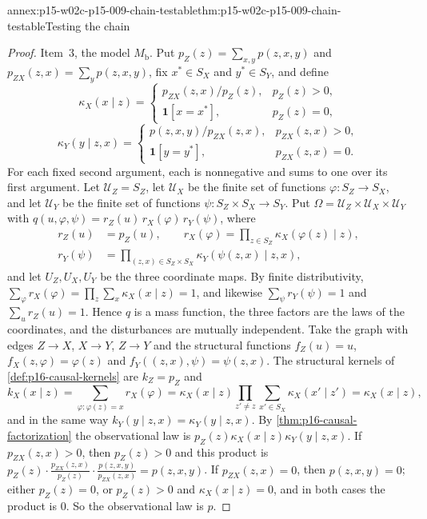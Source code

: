 \begin{annexitem}{annex:p15-w02c-p15-009-chain-testable}{thm:p15-w02c-p15-009-chain-testable}{Testing the chain}
\begin{proof}
Item~3, the model \(M_{\mathrm b}\). Put
\(p_Z(z)=\sum_{x,y}p(z,x,y)\) and \(p_{ZX}(z,x)=\sum_yp(z,x,y)\), fix
\(x^*\in S_X\) and \(y^*\in S_Y\), and define
\[
 \kappa_X(x\mid z)=
 \begin{cases}p_{ZX}(z,x)/p_Z(z),&p_Z(z)>0,\\
  \mathbf 1[x=x^*],&p_Z(z)=0,\end{cases}
\]
\[
 \kappa_Y(y\mid z,x)=
 \begin{cases}p(z,x,y)/p_{ZX}(z,x),&p_{ZX}(z,x)>0,\\
  \mathbf 1[y=y^*],&p_{ZX}(z,x)=0.\end{cases}
\]
For each fixed second argument, each is nonnegative and sums to one over
its first argument. Let \(\mathcal U_Z=S_Z\), let \(\mathcal U_X\) be the
finite set of functions \(\varphi:S_Z\to S_X\), and let \(\mathcal U_Y\)
be the finite set of functions \(\psi:S_Z\times S_X\to S_Y\). Put
\(\Omega=\mathcal U_Z\times\mathcal U_X\times\mathcal U_Y\) with
\(q(u,\varphi,\psi)=r_Z(u)\,r_X(\varphi)\,r_Y(\psi)\), where
\[
\begin{aligned}
 r_Z(u)&=p_Z(u),\qquad
 r_X(\varphi)=\prod_{z\in S_Z}\kappa_X(\varphi(z)\mid z),\\
 r_Y(\psi)&=\prod_{(z,x)\in S_Z\times S_X}\kappa_Y(\psi(z,x)\mid z,x),
\end{aligned}
\]
and let \(U_Z,U_X,U_Y\) be the three coordinate maps. By finite
distributivity, \(\sum_\varphi r_X(\varphi)
=\prod_z\sum_x\kappa_X(x\mid z)=1\), and likewise
\(\sum_\psi r_Y(\psi)=1\) and \(\sum_ur_Z(u)=1\). Hence \(q\) is a mass
function, the three factors are the laws of the coordinates, and the
disturbances are mutually independent. Take the graph with edges
\(Z\to X\), \(X\to Y\), \(Z\to Y\) and the structural functions
\(f_Z(u)=u\), \(f_X(z,\varphi)=\varphi(z)\) and
\(f_Y((z,x),\psi)=\psi(z,x)\). The structural kernels of
\cref{def:p16-causal-kernels} are \(k_Z=p_Z\) and
\[
 k_X(x\mid z)=\sum_{\varphi:\varphi(z)=x}r_X(\varphi)
 =\kappa_X(x\mid z)\prod_{z'\ne z}\sum_{x'\in S_X}\kappa_X(x'\mid z')
 =\kappa_X(x\mid z),
\]
and in the same way \(k_Y(y\mid z,x)=\kappa_Y(y\mid z,x)\). By
\cref{thm:p16-causal-factorization} the observational law is
\(p_Z(z)\kappa_X(x\mid z)\kappa_Y(y\mid z,x)\). If
\(p_{ZX}(z,x)>0\), then \(p_Z(z)>0\) and this product is
\(p_Z(z)\cdot\frac{p_{ZX}(z,x)}{p_Z(z)}\cdot
\frac{p(z,x,y)}{p_{ZX}(z,x)}=p(z,x,y)\). If \(p_{ZX}(z,x)=0\), then
\(p(z,x,y)=0\); either \(p_Z(z)=0\), or \(p_Z(z)>0\) and
\(\kappa_X(x\mid z)=0\), and in both cases the product is \(0\). So the
observational law is \(p\).


\end{proof}
\end{annexitem}
